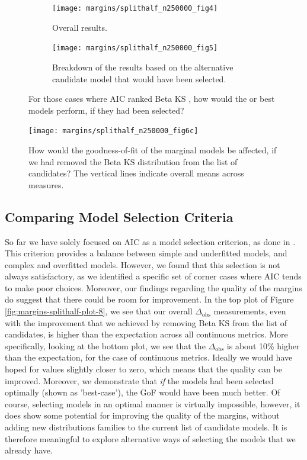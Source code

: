 \begin{figure}[!t]
	\begin{subfigure}{1\textwidth}
		\centering
		\texttt{[image: margins/splithalf\_n250000\_fig4]}
		\caption{Overall results.}
		\label{fig:margins-splithalf-plot-4}
	\end{subfigure} \newline
	\begin{subfigure}{1\textwidth}
		\centering
		\texttt{[image: margins/splithalf\_n250000\_fig5]}
		\caption{Breakdown of the results based on the alternative candidate model that would have been selected.}
		\label{fig:margins-splithalf-plot-5}
	\end{subfigure}
	\caption{For those cases where AIC ranked Beta KS , how would the  or  best models perform, if they had been selected?}
	\label{fig:margins-splithalf-plot-4,5}
\end{figure}

\begin{figure}[!t]
	\centering	
	\texttt{[image: margins/splithalf\_n250000\_fig6c]}
	\caption{How would the goodness-of-fit of the marginal models be affected, if we had removed the Beta KS distribution from the list of candidates? The vertical lines indicate overall means across measures.}
	\label{fig:margins-splithalf-plot-6}
\end{figure}

\clearpage 


\subsection{Comparing Model Selection Criteria}

So far we have solely focused on AIC as a model selection criterion, as done in \cite{Urbano2019}. This criterion provides a balance between simple and underfitted models, and complex and overfitted models. However, we found that this selection is not always satisfactory, as we identified a specific set of corner cases where AIC tends to make poor choices. Moreover, our findings regarding the quality of the margins do suggest that there could be room for improvement. In the top plot of Figure \ref{fig:margins-splithalf-plot-8}, we see that our overall $\Delta_{\text{obs}}$ measurements, even with the improvement that we achieved by removing Beta KS from the list of candidates, is higher than the expectation across all continuous metrics. More specifically, looking at the bottom plot, we see that the $\Delta_{\text{obs}}$ is about 10\% higher than the expectation, for the case of continuous metrics. Ideally we would have hoped for values slightly closer to zero, which means that the quality can be improved. Moreover, we demonstrate that \textit{if} the models had been selected optimally (shown as 'best-case'), the GoF would have been much better. Of course, selecting models in an optimal manner is virtually impossible, however, it does show some potential for improving the quality of the margins, without adding new distributions families to the current list of candidate models. It is therefore meaningful to explore alternative ways of selecting the models that we already have. 

